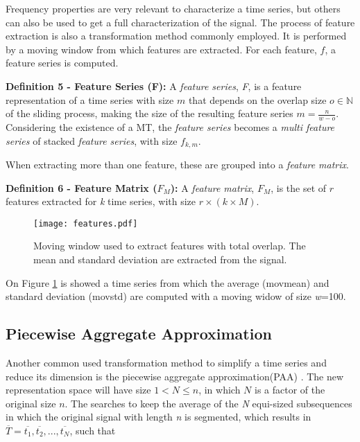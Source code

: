 Frequency properties are very relevant to characterize a time series, but others can also be used to get a full characterization of the signal. The process of feature extraction is also a transformation method commonly employed. It is performed by a moving window from which features are extracted. For each feature, $f$, a feature series is computed.


\item \textbf{Definition 5 - Feature Series (F):} A \textit{feature series}, \textit{F}, is a feature representation of a time series with size $m$ that depends on the overlap size $o \in \mathbb{N}$ of the sliding process, making the size of the resulting feature series $m = \frac{n}{w-o}$. Considering the existence of a MT, the \textit{feature series} becomes a \textit{multi feature series} of stacked \textit{feature series}, with size $f_{k,m}$.
    
When extracting more than one feature, these are grouped into a \textit{feature matrix}.
    
\item \textbf{Definition 6 - Feature Matrix ($F_M$):} A \textit{feature matrix}, $F_M$, is the set of $r$ features extracted for \textit{k} time series, with size $r \times (k\times M)$.
    
\begin{figure}
\centering
\texttt{[image: features.pdf]}
\label{fig:feature_intro}
\caption{Moving window used to extract features with total overlap. The mean and standard deviation are extracted from the signal.}
\end{figure}
    
On Figure \ref{fig:feature_intro} is showed a time series from which the average (movmean) and standard deviation (movstd) are computed with a moving widow of size \textit{w}=100.   

\subsection{Piecewise Aggregate Approximation}
\label{subsec:paa}

Another common used transformation method to simplify a time series and reduce its dimension is the piecewise aggregate approximation(PAA) \cite{paa}. The new representation space will have size $1 < N \leq n$, in which $N$ is a factor of the original size $n$. The searches to keep the average of the \textit{N} equi-sized subsequences in which the original signal with length \textit{n} is segmented, which results in $\overline{T} = \overline{t_1}, \overline{t_2}, ...,\overline{t_N}$, such that \cite{paa}

